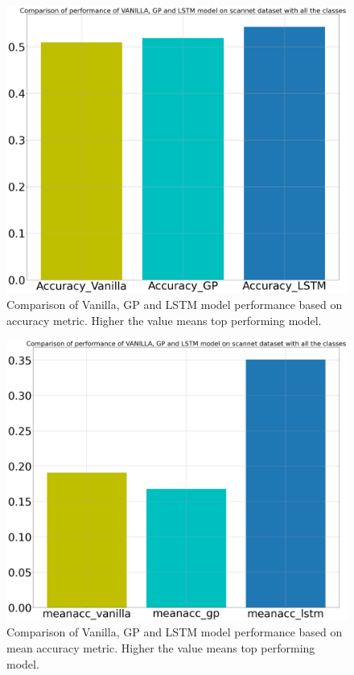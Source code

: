 
	\begin{figure}
		\centering
		\includegraphics[width=12cm]{images/all_classes_acc.png}
		\caption{Comparison of Vanilla, GP and LSTM model performance based on  accuracy metric. Higher the value means top performing model.}
		\label{fig:unet_model_metric_comparison_all_classes}
	\end{figure}

	\begin{figure}
		\centering
		\includegraphics[width=12cm]{images/all_classes_meanacc.png}
		\caption{Comparison of Vanilla, GP and LSTM model performance based on mean accuracy metric. Higher the value means top performing model.}
		\label{fig:unet_model_metric_comparison_all_classes}
	\end{figure}

